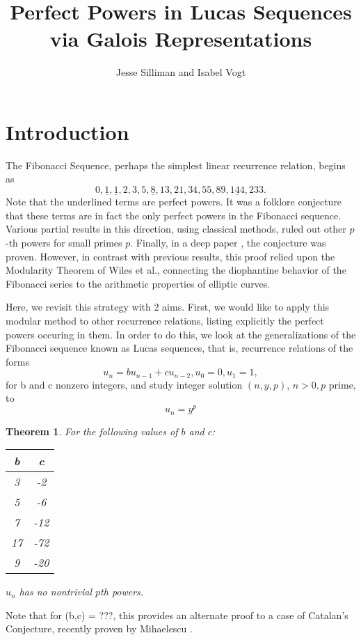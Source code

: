 \documentclass[12pt]{amsart}
\newtheorem{thm}{Theorem}[section]
\theoremstyle{definition}
\begin{document}
\title{Perfect Powers in Lucas Sequences via Galois Representations}
\author{Jesse Silliman and Isabel Vogt}

\maketitle


\section{Introduction}
The Fibonacci Sequence, perhaps the simplest linear recurrence relation, begins as \[0,\underline{1},\underline{1},2,3,5,\underline{8},13,21,34,55,89,\underline{144},233.\] Note that the underlined terms are perfect powers. It was a folklore conjecture that these terms are in fact the only perfect powers in the Fibonacci sequence. Various partial results in this direction, using classical methods, ruled out other $p$-th powers for small primes $p$. Finally, in a deep paper \cite{siksek06}, the conjecture was proven. However, in contrast with previous results, this proof relied upon the Modularity Theorem of Wiles et al., connecting the diophantine behavior of the Fibonacci series to the arithmetic properties of elliptic curves.

Here, we revisit this strategy with 2 aims. First, we would like to apply this modular method to other recurrence relations, listing explicitly the perfect powers occuring in them. In order to do this, we look at the generalizations of the Fibonacci sequence known as Lucas sequences, that is, recurrence relations of the forms \[ u_n = b u_{n-1} + c u_{n-2}, u_0 = 0, u_1 = 1, \] for b and c nonzero integers, and study integer solution $(n,y,p)$, $n > 0, p$ prime, to \begin{equation}\label{the_eqn}u_n = y^p\end{equation}

\begin{thm}\label{explicit_eg_thm}
For the following values of $b$ and $c$:
\begin{center}
\begin{tabular}{c | c }
b & c \\  \hline \hline
3 & -2 \\
5 & -6  \\
7 & -12 \\
17 & -72  \\
9 & -20 \\ \hline \hline
\end{tabular}
\end{center}
$u_n$ has no nontrivial $p$th powers. %
\end{thm}
Note that for (b,c) = ???, this provides an alternate proof to a case of Catalan's Conjecture, recently proven by Mihaelescu \cite{mih04}.
\end{document}

